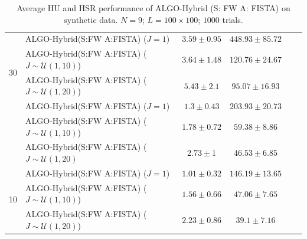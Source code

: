 \begin{table}[h]
\begin{adjustbox}{max width=\textwidth}
\begin{tabular}{|c|l|c|c|c|c|}
\multirow{4}{*}{30} & ALGO-Hybrid(S:FW A:FISTA) ($J=1$)                     & $3.59     \pm 0.95$   & $448.93   \pm 85.72$  \tabularnewline
                    & ALGO-Hybrid(S:FW A:FISTA) ($J\sim\mathcal{U}(1,10)$)  & $3.64     \pm 1.48$   & $120.76   \pm 24.67$  \tabularnewline
                    & ALGO-Hybrid(S:FW A:FISTA) ($J\sim\mathcal{U}(1,20)$)  & $5.43     \pm 2.1$    & $95.07    \pm 16.93$  \tabularnewline \cline{1-4}
\multirow{4}{*}{20} & ALGO-Hybrid(S:FW A:FISTA) ($J=1$)                     & $1.3      \pm 0.43$   & $203.93   \pm 20.73$  \tabularnewline
                    & ALGO-Hybrid(S:FW A:FISTA) ($J\sim\mathcal{U}(1,10)$)  & $1.78     \pm 0.72$   & $59.38    \pm 8.86$   \tabularnewline
                    & ALGO-Hybrid(S:FW A:FISTA) ($J\sim\mathcal{U}(1,20)$   & $2.73     \pm  1$     & $46.53    \pm 6.85$   \tabularnewline \cline{1-4}
\multirow{4}{*}{10} & ALGO-Hybrid(S:FW A:FISTA) ($J=1$)                     & $1.01     \pm 0.32$   & $146.19   \pm 13.65$  \tabularnewline
                    & ALGO-Hybrid(S:FW A:FISTA) ($J\sim\mathcal{U}(1,10)$)  & $1.56     \pm 0.66$   & $47.06    \pm 7.65$   \tabularnewline
                    & ALGO-Hybrid(S:FW A:FISTA) ($J\sim\mathcal{U}(1,20)$)  & $2.23     \pm 0.86$   & $39.1     \pm 7.16$   \tabularnewline \cline{1-4}
\end{tabular}
\end{adjustbox}
\caption{Average HU and HSR performance of ALGO-Hybrid (S: FW A: FISTA) on synthetic data.
         $N = 9$; $L = 100 \times 100$; $1000$ trials.}
\label{table:results_full_HYBRID_FW_FISTA_MO9}
\end{table}

\newpage


